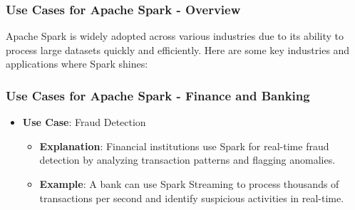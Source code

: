 \documentclass[aspectratio=169]{beamer}
\begin{document}
\begin{frame}[fragile]
    \frametitle{Use Cases for Apache Spark - Overview}
    Apache Spark is widely adopted across various industries due to its ability to process large datasets quickly and efficiently. Here are some key industries and applications where Spark shines:
\end{frame}

\begin{frame}[fragile]
    \frametitle{Use Cases for Apache Spark - Finance and Banking}
    \begin{itemize}
        \item \textbf{Use Case}: Fraud Detection
        \begin{itemize}
            \item \textbf{Explanation}: Financial institutions use Spark for real-time fraud detection by analyzing transaction patterns and flagging anomalies.
            \item \textbf{Example}: A bank can use Spark Streaming to process thousands of transactions per second and identify suspicious activities in real-time.
        \end{itemize}
    \end{itemize}
\end{frame}
\end{document}
